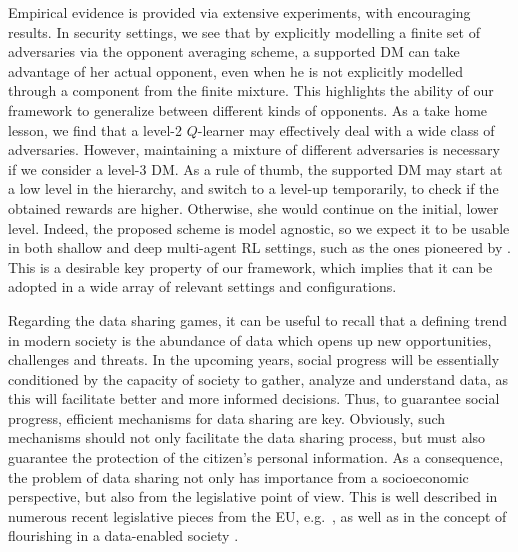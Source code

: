 Empirical evidence is provided via extensive experiments, with encouraging results. In security settings, we see that by explicitly modelling a finite set of adversaries via the opponent averaging scheme, a supported DM can take advantage of her actual opponent, even when he is not explicitly modelled through a component from the finite mixture. This highlights the ability of our framework to generalize between different kinds of opponents. As a take home lesson, we find that a level-2 $Q$-learner may effectively deal with a wide class of adversaries. However, maintaining a mixture of different adversaries is necessary if we consider a level-3 DM. As a rule of thumb, the supported DM may start at a low level in the hierarchy, and switch to a level-up temporarily, to check if the obtained rewards are higher. Otherwise, she would  continue on the initial, lower level.  %
Indeed, the proposed scheme is
model agnostic, so we expect it to be usable in both shallow and deep multi-agent RL settings, such as the ones pioneered by \parencite{mnih2015human}. This is a desirable key property of our framework, which implies that it can be adopted in a wide array of relevant settings and configurations.











Regarding the data sharing games, it can be useful to recall that a defining trend in modern society is the abundance 
of data which opens up new opportunities, challenges
and threats. In the upcoming years, social progress will be essentially conditioned by the capacity of society to gather, analyze and understand data, as this will 
facilitate better and more informed decisions. 
Thus, to guarantee social progress,  efficient mechanisms
for data sharing are key. Obviously, such mechanisms
should not only facilitate the data sharing process, 
but must also guarantee the protection of the citizen's personal
information. As a consequence, the problem of data sharing not only
has importance from a socioeconomic perspective, but also from the
legislative point of view. This is well described in numerous recent legislative pieces from the 
EU, e.g.\ \parencite{europe1}, as well as in the concept of flourishing 
in a data-enabled society \parencite{allea}. 

